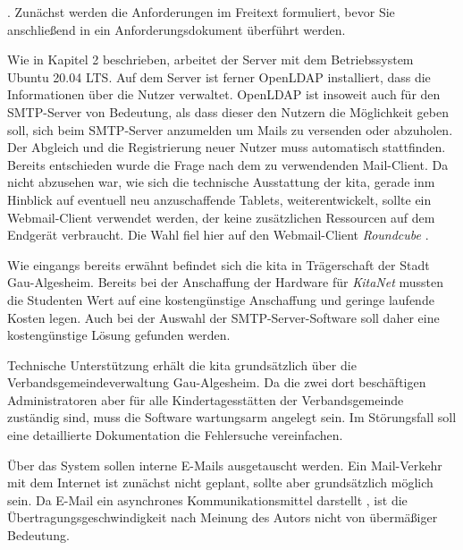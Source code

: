  \citep[][454]{Balzert2010}.
Zunächst werden die Anforderungen im Freitext formuliert, bevor Sie anschließend in ein Anforderungsdokument überführt werden.  

Wie in Kapitel 2 beschrieben, arbeitet der Server mit dem Betriebssystem Ubuntu 20.04 LTS. Auf dem Server ist ferner OpenLDAP installiert, dass die Informationen über die Nutzer verwaltet. OpenLDAP ist insoweit auch für den SMTP-Server von Bedeutung, als dass dieser den Nutzern die Möglichkeit geben soll, sich beim SMTP-Server anzumelden um Mails zu versenden oder abzuholen. Der Abgleich und die Registrierung neuer Nutzer muss automatisch stattfinden.
Bereits entschieden wurde die Frage nach dem zu verwendenden Mail-Client. 
Da nicht abzusehen war, wie sich die technische Ausstattung der \ac{kita}, gerade inm Hinblick auf eventuell neu anzuschaffende Tablets, weiterentwickelt, sollte ein Webmail-Client verwendet werden, der keine zusätzlichen Ressourcen auf dem Endgerät verbraucht. Die Wahl fiel hier auf den Webmail-Client \textit{Roundcube} \citep[vgl.][]{roundcubemain}. 

Wie eingangs bereits erwähnt befindet sich die \ac{kita} in Trägerschaft der Stadt Gau-Algesheim. Bereits bei der Anschaffung der Hardware für \textit{KitaNet} mussten die Studenten Wert auf eine kostengünstige Anschaffung und geringe laufende Kosten legen. Auch bei der Auswahl der SMTP-Server-Software soll daher eine kostengünstige Lösung gefunden werden.

Technische Unterstützung erhält die  \ac{kita} grundsätzlich über die Verbandsgemeindeverwaltung Gau-Algesheim. Da die zwei dort beschäftigen Administratoren aber für alle Kindertagesstätten der Verbandsgemeinde zuständig sind, muss die Software wartungsarm angelegt sein. Im Störungsfall soll eine detaillierte Dokumentation die Fehlersuche vereinfachen.

Über das System sollen interne E-Mails ausgetauscht werden. Ein Mail-Verkehr mit dem Internet ist zunächst nicht geplant, sollte aber grundsätzlich möglich sein.
Da E-Mail ein asynchrones Kommunikationsmittel darstellt \citep[vgl.][10]{Duerscheid2003}, ist die Übertragungsgeschwindigkeit nach Meinung des Autors nicht von übermäßiger Bedeutung. 

